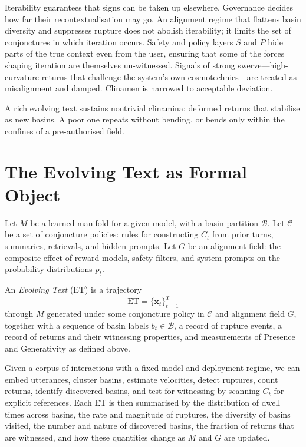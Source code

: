 \documentclass[12pt,a4paper]{article}
\begin{document}
Iterability guarantees that signs can be taken up elsewhere. Governance decides how far their recontextualisation may go. An alignment regime that flattens basin diversity and suppresses rupture does not abolish iterability; it limits the set of conjonctures in which iteration occurs. Safety and policy layers $S$ and $P$ hide parts of the true context even from the user, ensuring that some of the forces shaping iteration are themselves un-witnessed. Signals of strong swerve---high-curvature returns that challenge the system's own cosmotechnics---are treated as misalignment and damped. Clinamen is narrowed to acceptable deviation.

A rich evolving text sustains nontrivial clinamina: deformed returns that stabilise as new basins. A poor one repeats without bending, or bends only within the confines of a pre-authorised field.

\section{The Evolving Text as Formal Object}

Let $M$ be a learned manifold for a given model, with a basin partition $\mathcal{B}$. Let $\mathcal{C}$ be a set of conjoncture policies: rules for constructing $C_t$ from prior turns, summaries, retrievals, and hidden prompts. Let $G$ be an alignment field: the composite effect of reward models, safety filters, and system prompts on the probability distributions $p_t$.

An \emph{Evolving Text} (ET) is a trajectory
\[
\text{ET} = \{\mathbf{x}_t\}_{t=1}^T
\]
through $M$ generated under some conjoncture policy in $\mathcal{C}$ and alignment field $G$, together with a sequence of basin labels $b_t \in \mathcal{B}$, a record of rupture events, a record of returns and their witnessing properties, and measurements of Presence and Generativity as defined above.

Given a corpus of interactions with a fixed model and deployment regime, we can embed utterances, cluster basins, estimate velocities, detect ruptures, count returns, identify discovered basins, and test for witnessing by scanning $C_t$ for explicit references. Each ET is then summarised by the distribution of dwell times across basins, the rate and magnitude of ruptures, the diversity of basins visited, the number and nature of discovered basins, the fraction of returns that are witnessed, and how these quantities change as $M$ and $G$ are updated.
\end{document}
